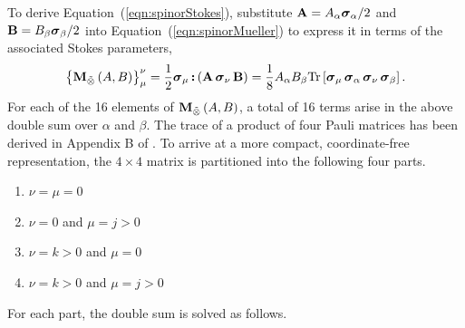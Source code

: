\documentclass[twocolumn]{aastex6}
\newcommand{\mbf}[1]{\mbox{\boldmath $#1$}}
\newcommand{\Eqn}[1]{Equation~(\ref{eqn:#1})}
\newcommand{\irow}{\mu} \newcommand{\icol}{\nu}
\newcommand{\srow}{j} \newcommand{\scol}{k}
\newcommand{\trace}{{\rm Tr}}
\newcommand{\tr}[1]{\trace\ensuremath{ \left[ {#1} \right] }}
\newcommand{\bilinear}[2]{\ensuremath{\left({#1},{#2}\right)}}
\newcommand{\stimes}{\ensuremath{\tilde{\otimes}}}
\newcommand{\spinorMueller}[2]{\ensuremath{{\bf M}_{\stimes}\bilinear{#1}{#2}}}
\newcommand{\dc}[2]{\ensuremath{{#1}\,\mbf{:}\,{#2}}}
\newcommand{\pauli}[1]{\ensuremath{\mbf{\sigma}_{#1}}}
\begin{document}
{\begin{appendix}
To derive \Eqn{spinorStokes}, substitute
%
${\bf A}=A_\alpha\pauli{\alpha}/2$ and ${\bf B}=B_\beta\pauli{\beta}/2$ 
%
into \Eqn{spinorMueller} to express it in terms of the associated
Stokes parameters,
%
\begin{equation}
\left\{\spinorMueller{A}{B}\right\}_\irow^\icol
  = \frac{1}{2} \dc{\pauli{\irow}}{\left({\bf A}\,\pauli{\icol}\,{\bf B}\right)}
  = \frac{1}{8} A_\alpha B_\beta \tr{\pauli{\irow}\,\pauli{\alpha}\,\pauli{\icol}\,\pauli{\beta}}.
\label{eqn:commutator_Mueller}
\end{equation}
%
For each of the 16 elements of \spinorMueller{A}{B}, a total of 16
terms arise in the above double sum over $\alpha$ and $\beta$.
%
The trace of a product of four Pauli matrices has been derived in
Appendix B of \citet{mel93a}.  To arrive at a more compact,
coordinate-free representation, the $4\times4$ matrix is partitioned
into the following four parts.
%
\begin{enumerate}
\item $\icol=\irow=0$
\item $\icol=0$ and $\irow=\srow>0$
\item $\icol=\scol>0$ and $\irow=0$
\item $\icol=\scol>0$ and $\irow=\srow>0$
\end{enumerate}
%
For each part, the double sum is solved as follows.


\end{appendix}}
\end{document}

